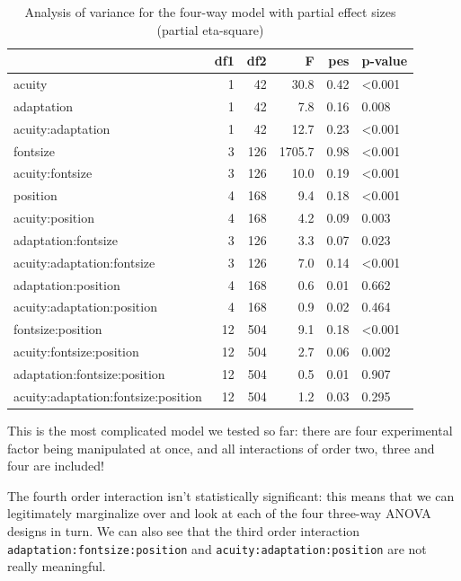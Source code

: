 \documentclass[
  11pt,
  letterpaper,
]{scrbook}
\theoremstyle{definition}
\theoremstyle{remark}
\begin{document}
\hypertarget{tbl-anova-fourway}{}
\begin{table}
\caption{\label{tbl-anova-fourway}Analysis of variance for the four-way model with partial effect sizes
(partial eta-square) }\tabularnewline

\centering
\begin{tabular}{lrrrrl}
\toprule
  & df1 & df2 & F & pes & p-value\\
\midrule
acuity & 1 & 42 & 30.8 & 0.42 & <0.001\\
adaptation & 1 & 42 & 7.8 & 0.16 & 0.008\\
acuity:adaptation & 1 & 42 & 12.7 & 0.23 & <0.001\\
fontsize & 3 & 126 & 1705.7 & 0.98 & <0.001\\
acuity:fontsize & 3 & 126 & 10.0 & 0.19 & <0.001\\
\addlinespace
position & 4 & 168 & 9.4 & 0.18 & <0.001\\
acuity:position & 4 & 168 & 4.2 & 0.09 & 0.003\\
adaptation:fontsize & 3 & 126 & 3.3 & 0.07 & 0.023\\
acuity:adaptation:fontsize & 3 & 126 & 7.0 & 0.14 & <0.001\\
adaptation:position & 4 & 168 & 0.6 & 0.01 & 0.662\\
\addlinespace
acuity:adaptation:position & 4 & 168 & 0.9 & 0.02 & 0.464\\
fontsize:position & 12 & 504 & 9.1 & 0.18 & <0.001\\
acuity:fontsize:position & 12 & 504 & 2.7 & 0.06 & 0.002\\
adaptation:fontsize:position & 12 & 504 & 0.5 & 0.01 & 0.907\\
acuity:adaptation:fontsize:position & 12 & 504 & 1.2 & 0.03 & 0.295\\
\bottomrule
\end{tabular}
\end{table}

This is the most complicated model we tested so far: there are four
experimental factor being manipulated at once, and all interactions of
order two, three and four are included!

The fourth order interaction isn't statistically significant: this means
that we can legitimately marginalize over and look at each of the four
three-way ANOVA designs in turn. We can also see that the third order
interaction \texttt{adaptation:fontsize:position} and
\texttt{acuity:adaptation:position} are not really meaningful.
\end{document}
